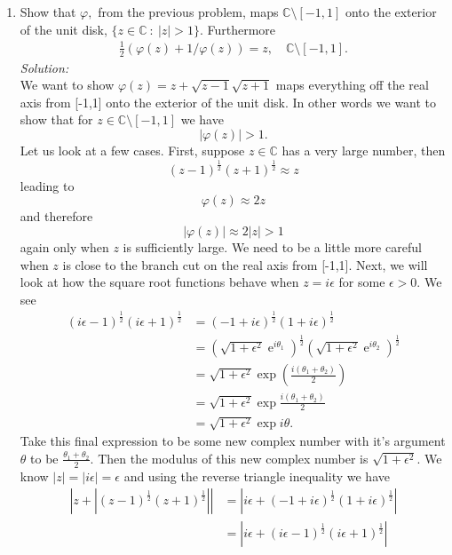 \documentclass[10pt]{amsart}
\DeclareMathOperator{\E}{e}
\theoremstyle{nonumberplain}
\begin{document}
\begin{enumerate}[label={\bf {\arabic*}:}]
 \item Show that $\varphi,$ from the previous problem, maps $\mathbb C \setminus [-1,1]$ onto the
   exterior of the unit disk, $\{ z \in \mathbb C ~:~ |z| > 1\}$.
   Furthermore
   \begin{align*}
     \frac 1 2 \left( \varphi(z) + 1/\varphi(z) \right) = z, \quad \mathbb C \setminus [-1,1].
   \end{align*}
\textit{Solution:} \\
We want to show $\varphi(z) = z + \sqrt{z - 1}\sqrt{z + 1}$ maps everything off the real axis from [-1,1] onto the exterior of the unit disk. In other words we want to show that for $z \in \mathbb C \setminus [-1,1]$ we have 
$$
\left| \varphi(z) \right| > 1.
$$
Let us look at a few cases. First, suppose $z \in \mathbb C$ has a very large number, then
$$
(z - 1)^{\frac{1}{2}}(z + 1)^{\frac{1}{2}} \approx z
$$
leading to
$$
\varphi(z) \approx 2z
$$
and therefore
$$
|\varphi(z)| \approx 2|z| > 1
$$
again only when $z$ is sufficiently large.
We need to be a little more careful when $z$ is close to the branch cut on the real axis from [-1,1].
Next, we will look at how the square root functions behave when $z = i\epsilon$ for some $\epsilon > 0$.
We see
\begin{align*}
(i\epsilon -1)^{\frac{1}{2}}(i\epsilon + 1)^{\frac{1}{2}} &= (-1 + i\epsilon)^{\frac{1}{2}}(1 + i\epsilon)^{\frac{1}{2}} \\
									      &= (\sqrt{1 + \epsilon^2}\E^{i\theta_1})^{\frac{1}{2}}(\sqrt{1 + \epsilon^2}\E^{i\theta_2})^{\frac{1}{2}} \\
									      &= \sqrt{1 + \epsilon^2}\exp{\left(\frac{i(\theta_1 + \theta_2)}{2}\right)} \\
									      &= \sqrt{1 + \epsilon^2}\exp{\frac{i(\theta_1 + \theta_2)}{2}} \\
									      &= \sqrt{1 + \epsilon^2}\exp{i\theta}.
\end{align*}
Take this final expression to be some new complex number with it's argument $\theta$ to be $\frac{\theta_1 + \theta_2}{2}$.
Then the modulus of this new complex number is $\sqrt{1 + \epsilon^2}$.
We know $|z| = |i\epsilon| = \epsilon$ and using the reverse triangle inequality we have
\begin{align*}
\left| z + |(z - 1)^{\frac{1}{2}}(z + 1)^{\frac{1}{2}}|\right| &= \left| i\epsilon + (- 1 + i\epsilon)^{\frac{1}{2}}(1 + i\epsilon)^{\frac{1}{2}}\right| \\
										  &= \left| i\epsilon + (i\epsilon - 1)^{\frac{1}{2}}(i\epsilon + 1)^{\frac{1}{2}}\right| \\

\end{align*}
\end{enumerate}
\end{document}
